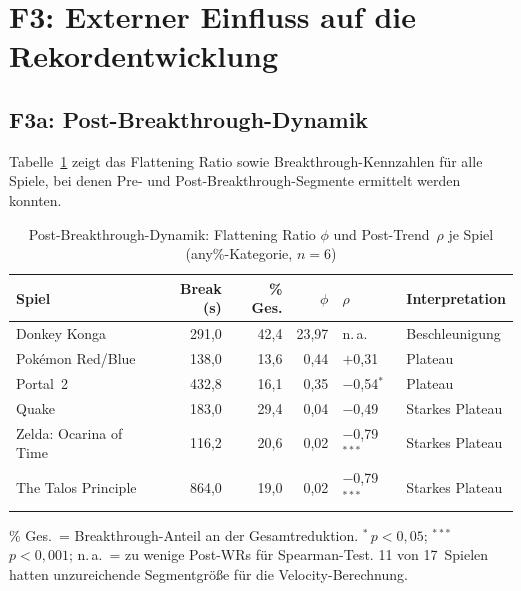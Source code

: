 

\section{F3: Externer Einfluss auf die Rekordentwicklung}

\subsection*{F3a: Post-Breakthrough-Dynamik}

Tabelle~\ref{tab:f3a} zeigt das Flattening Ratio sowie Breakthrough-Kennzahlen für alle Spiele, bei denen Pre- und Post-Breakthrough-Segmente ermittelt werden konnten.

\begin{table}[htb]
  \centering
  \caption{Post-Breakthrough-Dynamik: Flattening Ratio $\phi$ und Post-Trend~$\rho$ je Spiel (any\%-Kategorie, $n = 6$)}
  \label{tab:f3a}
  \small
  \begin{tabular}{lrrrll}
    \toprule
    \textbf{Spiel} & \textbf{Break (s)} & \textbf{\% Ges.} & \textbf{$\phi$} & \textbf{$\rho$} & \textbf{Interpretation} \\
    \midrule
    Donkey Konga                 & 291,0 & 42,4 & 23,97 & n.\,a.               & Beschleunigung \\
    Pokémon Red/Blue             & 138,0 & 13,6 &  0,44 & $+$0,31              & Plateau \\
    Portal~2                     & 432,8 & 16,1 &  0,35 & $-$0,54$^{*}$        & Plateau \\
    Quake                        & 183,0 & 29,4 &  0,04 & $-$0,49              & Starkes Plateau \\
    Zelda: Ocarina of Time       & 116,2 & 20,6 &  0,02 & $-$0,79$^{***}$      & Starkes Plateau \\
    The Talos Principle          & 864,0 & 19,0 &  0,02 & $-$0,79$^{***}$      & Starkes Plateau \\
    \bottomrule
  \end{tabular}
  \smallskip\par\noindent
  {\small \% Ges.\ = Breakthrough-Anteil an der Gesamtreduktion. $^{*}$\,$p < 0{,}05$; $^{***}$\,$p < 0{,}001$; n.\,a.\ = zu wenige Post-WRs für Spearman-Test. 11 von 17~Spielen hatten unzureichende Segmentgröße für die Velocity-Berechnung.}
\end{table}

